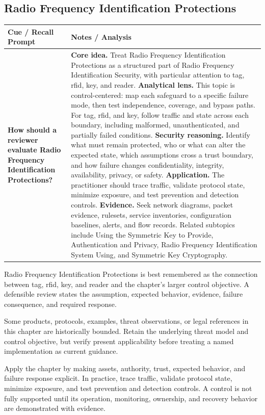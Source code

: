 \documentclass[11pt]{article}
\newcommand{\CornellHeader}{%
\rowcolor{Navy}\color{white}\bfseries Cue / Recall Prompt & \color{white}\bfseries Notes / Analysis\\\hline}
\newcommand{\CornellRow}[2]{%
\cellcolor{CueGray}\RaggedRight\textbf{#1} & \RaggedRight #2\\\hline}
\begin{document}
\subsection*{Radio Frequency Identification Protections}
\begin{longtable}{>{\RaggedRight\arraybackslash}p{}|>{\RaggedRight\arraybackslash}p{}}
\CornellHeader
\CornellRow{How should a reviewer evaluate Radio Frequency Identification Protections?}{\textbf{Core idea.} Treat Radio Frequency Identification Protections as a structured part of Radio Frequency Identification Security, with particular attention to tag, rfid, key, and reader. \textbf{Analytical lens.} This topic is control-centered: map each safeguard to a specific failure mode, then test independence, coverage, and bypass paths. For tag, rfid, and key, follow traffic and state across each boundary, including malformed, unauthenticated, and partially failed conditions. \textbf{Security reasoning.} Identify what must remain protected, who or what can alter the expected state, which assumptions cross a trust boundary, and how failure changes confidentiality, integrity, availability, privacy, or safety. \textbf{Application.} The practitioner should trace traffic, validate protocol state, minimize exposure, and test prevention and detection controls. \textbf{Evidence.} Seek network diagrams, packet evidence, rulesets, service inventories, configuration baselines, alerts, and flow records. Related subtopics include Using the Symmetric Key to Provide, Authentication and Privacy, Radio Frequency Identification System Using, and Symmetric Key Cryptography.}
\end{longtable}
\begin{topicsummary}
Radio Frequency Identification Protections is best remembered as the connection between tag, rfid, key, and reader and the chapter's larger control objective. A defensible review states the assumption, expected behavior, evidence, failure consequence, and required response.
\end{topicsummary}
\begin{historybox}
Some products, protocols, examples, threat observations, or legal references in this chapter are historically bounded. Retain the underlying threat model and control objective, but verify present applicability before treating a named implementation as current guidance.
\end{historybox}
\begin{defensebox}
Apply the chapter by making assets, authority, trust, expected behavior, and failure response explicit. In practice, trace traffic, validate protocol state, minimize exposure, and test prevention and detection controls. A control is not fully supported until its operation, monitoring, ownership, and recovery behavior are demonstrated with evidence.
\end{defensebox}
\end{document}
